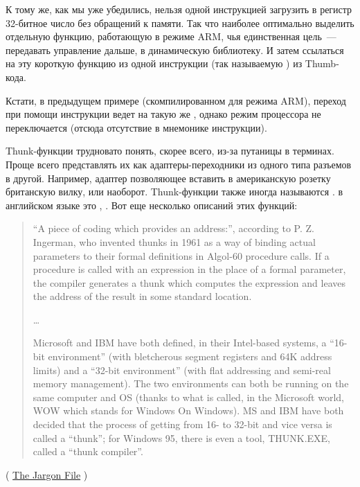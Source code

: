 К тому же, как мы уже убедились, нельзя одной инструкцией загрузить в регистр 32-битное число без обращений к памяти.
Так что наиболее оптимально выделить отдельную функцию, работающую в режиме ARM, 
чья единственная цель~--- передавать управление дальше, в динамическую библиотеку.
И затем ссылаться на эту короткую функцию из одной инструкции (так называемую ) из Thumb-кода.

Кстати, в предыдущем примере (скомпилированном для режима ARM), переход при помощи инструкции  ведет 
на такую же , однако режим процессора не переключается (отсюда отсутствие  в мнемонике инструкции).


Thunk-функции трудновато понять, скорее всего, из-за путаницы в терминах.
Проще всего представлять их как адаптеры-переходники из одного типа разъемов в другой.
Например, адаптер позволяющее вставить в американскую розетку британскую вилку, или наоборот.
Thunk-функции также иногда называются .  в английском языке это , .
Вот еще несколько описаний этих функций:

\begin{framed}
\begin{quotation}
“A piece of coding which provides an address:”, according to P. Z. Ingerman, 
who invented thunks in 1961 as a way of binding actual parameters to their formal 
definitions in Algol-60 procedure calls. If a procedure is called with an expression 
in the place of a formal parameter, the compiler generates a thunk which computes 
the expression and leaves the address of the result in some standard location.

\dots

Microsoft and IBM have both defined, in their Intel-based systems, a “16-bit environment” 
(with bletcherous segment registers and 64K address limits) and a “32-bit environment” 
(with flat addressing and semi-real memory management). The two environments can both be 
running on the same computer and OS (thanks to what is called, in the Microsoft world, 
WOW which stands for Windows On Windows). MS and IBM have both decided that the process 
of getting from 16- to 32-bit and vice versa is called a “thunk”; for Windows 95, 
there is even a tool, THUNK.EXE, called a “thunk compiler”.
\end{quotation}
\end{framed}
( \href{http://go.yurichev.com/17362}{The Jargon File} )

